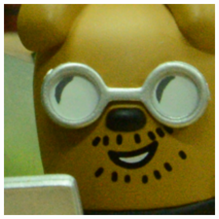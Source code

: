 \documentclass[10pt,twocolumn,letterpaper,sort&compress]{article}
\begin{document}
\begin{figure}
{\begin{minipage}{0.085\textwidth}
\end{minipage}
\begin{minipage}{0.085\textwidth}
\includegraphics[width=1\textwidth]{CC15images/resize_d800_iso3200_1_real.png}
\end{minipage}
}\vspace{-3mm}
\end{figure}
\end{document}
